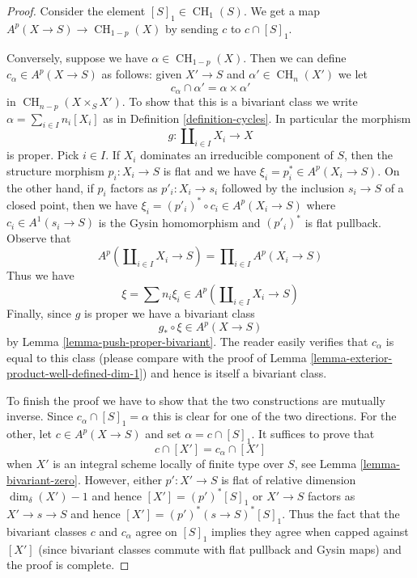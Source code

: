 \documentclass[10pt,a4paper]{amsart}
\theoremstyle{plain}
\theoremstyle{definition}
\theoremstyle{remark}
\numberwithin{equation}{subsection}
\def\CH{\mathop{\mathrm{CH}}\nolimits}
\begin{document}
\begin{proof}
Consider the element $[S]_1 \in \CH_1(S)$. We get a map
$A^p(X \to S) \to \CH_{1 - p}(X)$ by sending $c$ to $c \cap [S]_1$.

\medskip\noindent
Conversely, suppose we have $\alpha \in \CH_{1 - p}(X)$.
Then we can define $c_\alpha \in A^p(X \to S)$ as
follows: given $X' \to S$ and $\alpha' \in \CH_n(X')$
we let
$$
c_\alpha \cap \alpha' = \alpha \times \alpha'
$$
in $\CH_{n - p}(X \times_S X')$. To show that this is a bivariant
class we write $\alpha = \sum_{i \in I} n_i[X_i]$ as in
Definition \ref{definition-cycles}. In particular the morphism
$$
g : \coprod\nolimits_{i \in I} X_i \longrightarrow X
$$
is proper. Pick $i \in I$. If $X_i$ dominates an irreducible component
of $S$, then the structure morphism $p_i : X_i \to S$ is flat and we have
$\xi_i = p_i^* \in A^p(X_i \to S)$. On the other hand, if $p_i$ factors
as $p'_i : X_i \to s_i$ followed by the inclusion $s_i \to S$
of a closed point, then we have
$\xi_i = (p'_i)^* \circ c_i \in A^p(X_i \to S)$
where $c_i \in A^1(s_i \to S)$ is the Gysin homomorphism and
$(p'_i)^*$ is flat pullback. Observe that
$$
A^p(\coprod\nolimits_{i \in I} X_i \to S) =
\prod\nolimits_{i \in I} A^p(X_i \to S)
$$
Thus we have
$$
\xi = \sum n_i \xi_i \in A^p(\coprod\nolimits_{i \in I} X_i \to S)
$$
Finally, since $g$ is proper we have a bivariant class
$$
g_* \circ \xi \in A^p(X \to S)
$$
by Lemma \ref{lemma-push-proper-bivariant}. The reader easily
verifies that $c_\alpha$ is equal to this class
(please compare with the proof of
Lemma \ref{lemma-exterior-product-well-defined-dim-1})
and hence is itself a bivariant class.

\medskip\noindent
To finish the proof we have to show that the two constructions
are mutually inverse. Since $c_\alpha \cap [S]_1 = \alpha$
this is clear for one of the two directions. For the other, let
$c \in A^p(X \to S)$ and set $\alpha = c \cap [S]_1$.
It suffices to prove that
$$
c \cap [X'] = c_\alpha \cap [X']
$$
when $X'$ is an integral scheme locally of finite type over $S$,
see Lemma \ref{lemma-bivariant-zero}. However, either $p' : X' \to S$
is flat of relative dimension $\dim_\delta(X') - 1$ and hence
$[X'] = (p')^*[S]_1$ or $X' \to S$ factors as $X' \to s \to S$
and hence $[X'] = (p')^*(s \to S)^*[S]_1$. Thus the fact that the
bivariant classes $c$ and $c_\alpha$ agree on $[S]_1$
implies they agree when capped against $[X']$ (since bivariant classes
commute with flat pullback and Gysin maps) and the proof is complete.
\end{proof}
\end{document}
